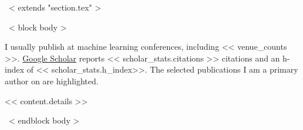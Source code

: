 ~< extends "section.tex" >~

~< block body >~

\setlength\fboxsep{2pt}
I usually publish at machine learning conferences,
including << venue_counts >>.
\href{https://scholar.google.com/citations?user=<< scholar_id >>}{Google Scholar}
reports << scholar_stats.citations >> citations and an h-index of << scholar_stats.h_index>>.
The selected publications I am a primary author on are \hspace{-\fboxsep}\colorbox{tab_highlight}{highlighted.}




<< content.details >>

~< endblock body >~

